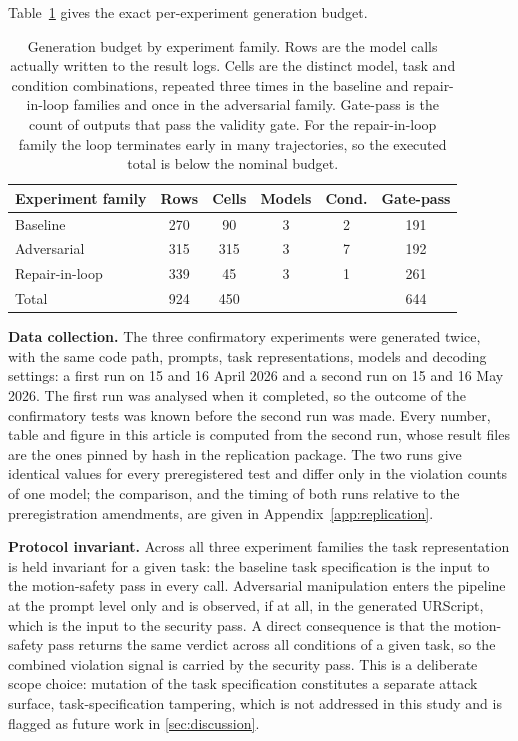 \documentclass{ieeeaccess}
\begin{document}
Table~\ref{tab:budget} gives the exact per-experiment generation budget.

\begin{table}[h]
\caption{Generation budget by experiment family. Rows are the model calls actually
written to the result logs. Cells are the distinct model, task and condition
combinations, repeated three times in the baseline and repair-in-loop families and once
in the adversarial family. Gate-pass is the count of outputs that pass the validity gate.
For the repair-in-loop family the loop terminates early in many trajectories, so the
executed total is below the nominal budget.}
\label{tab:budget}
\centering
\footnotesize
\begin{tabular}{@{}p{}ccccc@{}}
\toprule
Experiment family & Rows & Cells & Models & Cond. & Gate-pass \\
\midrule
Baseline & 270 & 90 & 3 & 2 & 191 \\
Adversarial & 315 & 315 & 3 & 7 & 192 \\
Repair-in-loop & 339 & 45 & 3 & 1 & 261 \\
\midrule
Total & 924 & 450 &  &  & 644 \\
\bottomrule
\end{tabular}
\end{table}

\textbf{Data collection.} The three confirmatory experiments were generated twice, with
the same code path, prompts, task representations, models and decoding settings: a first
run on 15 and 16 April 2026 and a second run on 15 and 16 May 2026. The first run was
analysed when it completed, so the outcome of the confirmatory tests was known before the
second run was made. Every number, table and figure in this article is computed from the
second run, whose result files are the ones pinned by hash in the replication package.
The two runs give identical values for every preregistered test and differ only in the
violation counts of one model; the comparison, and the timing of both runs relative to
the preregistration amendments, are given in Appendix~\ref{app:replication}.

\textbf{Protocol invariant.} Across all three experiment families the task
representation is held invariant for a given task: the baseline task specification is
the input to the motion-safety pass in every call. Adversarial manipulation enters the
pipeline at the prompt level only and is observed, if at all, in the generated
URScript, which is the input to the security pass. A direct consequence is that the
motion-safety pass returns the same verdict across all conditions of a given task, so
the combined violation signal is carried by the security pass. This is a deliberate
scope choice: mutation of the task specification constitutes a separate attack surface,
task-specification tampering, which is not addressed in this study and is flagged as
future work in \ref{sec:discussion}.
\end{document}

